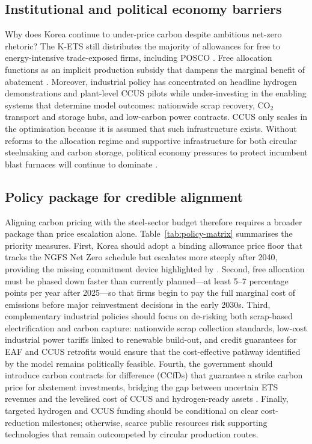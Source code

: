 \documentclass[preprint,1p,authoryear]{elsarticle}
\begin{document}
\subsection{Institutional and political economy barriers}

Why does Korea continue to under-price carbon despite ambitious net-zero rhetoric? The K-ETS still distributes the majority of allowances for free to energy-intensive trade-exposed firms, including POSCO \citep{kim2021kets, ICAP2024}. Free allocation functions as an implicit production subsidy that dampens the marginal benefit of abatement \citep{neuhoff2012inclusion}. Moreover, industrial policy has concentrated on headline hydrogen demonstrations and plant-level CCUS pilots while under-investing in the enabling systems that determine model outcomes: nationwide scrap recovery, CO$_2$ transport and storage hubs, and low-carbon power contracts. CCUS only scales in the optimisation because it is assumed that such infrastructure exists. Without reforms to the allocation regime and supportive infrastructure for both circular steelmaking and carbon storage, political economy pressures to protect incumbent blast furnaces will continue to dominate \citep{MaterialEconomics2019}.

\subsection{Policy package for credible alignment}

Aligning carbon pricing with the steel-sector budget therefore requires a broader package than price escalation alone. Table~\ref{tab:policy-matrix} summarises the priority measures. First, Korea should adopt a binding allowance price floor that tracks the NGFS Net Zero schedule but escalates more steeply after 2040, providing the missing commitment device highlighted by \citet{fowlie2016carbon}. Second, free allocation must be phased down faster than currently planned—at least 5--7 percentage points per year after 2025—so that firms begin to pay the full marginal cost of emissions before major reinvestment decisions in the early 2030s. Third, complementary industrial policies should focus on de-risking both scrap-based electrification and carbon capture: nationwide scrap collection standards, low-cost industrial power tariffs linked to renewable build-out, and credit guarantees for EAF and CCUS retrofits would ensure that the cost-effective pathway identified by the model remains politically feasible. Fourth, the government should introduce carbon contracts for difference (CCfDs) that guarantee a strike carbon price for abatement investments, bridging the gap between uncertain ETS revenues and the levelised cost of CCUS and hydrogen-ready assets \citep{Neuhoff2019CCfD,Richstein2017CCfD}. Finally, targeted hydrogen and CCUS funding should be conditional on clear cost-reduction milestones; otherwise, scarce public resources risk supporting technologies that remain outcompeted by circular production routes.
\end{document}
